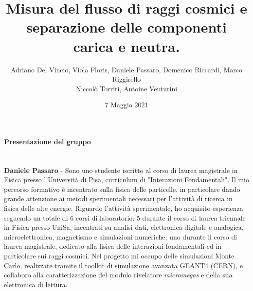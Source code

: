 \documentclass{article}
\title{\textbf{Misura del flusso di raggi cosmici e separazione delle componenti carica e neutra.}}
\author{Adriano Del Vincio, Viola Floris, Daniele Passaro, Domenico Riccardi, Marco Riggirello
\\
Niccolò Torriti, Antoine Venturini}
\date{7 Maggio 2021}
\begin{document}
\maketitle
\begin{center}
\textbf{\Large Presentazione del gruppo}
\end{center}

\section*{}

\textbf{Daniele Passaro} - Sono uno studente iscritto al corso di laurea magistrale in Fisica presso l'Università di Pisa, curriculum di  "Interazioni Fondamentali". 
Il mio percorso formativo è incentrato sulla fisica delle particelle, in particolare dando grande attenzione ai metodi sperimentali necessari per l'attività di ricerca in fisica delle alte energie. Riguardo l'attività sperimentale, ho acquisito esperienza seguendo un totale di 6 corsi di laboratorio: 5 durante il corso di laurea triennale in Fisica presso UniSa, incentrati su analisi dati, elettronica digitale e analogica, microelettronica, magnetismo e simulazioni numeriche; uno durante il corso di laurea magistrale, dedicato alla fisica delle interazioni fondamentali ed in particolare sui raggi cosmici.
Nel progetto mi occupo delle simulazioni Monte Carlo, realizzate tramite il toolkit di simulazione avanzata GEANT4 (\textcopyright CERN), e collaboro alla caratterizzazione del modulo rivelatore \emph{micromegas} e della sua elettronica di lettura. 
\end{document}
